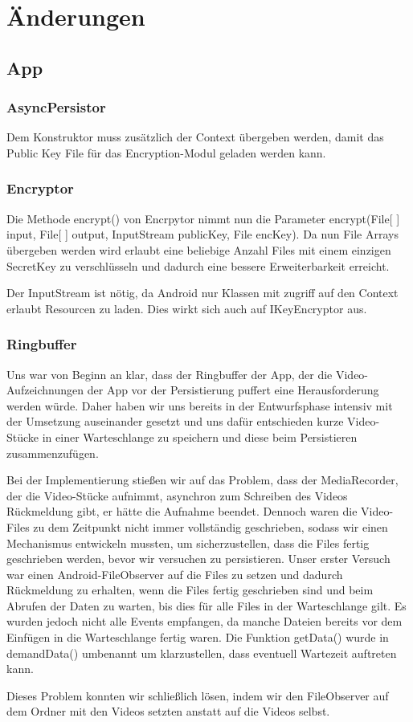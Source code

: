 \chapter{Änderungen} \label{chap:Aenderungen}

\section{App}

\subsection{AsyncPersistor}
Dem Konstruktor muss zusätzlich der Context übergeben werden, damit das Public Key File für das Encryption-Modul geladen werden kann.

\subsection{Encryptor}
Die Methode encrypt() von Encrpytor nimmt nun die Parameter encrypt(File[ ] input, File[ ] output, InputStream publicKey, File encKey). Da nun File Arrays übergeben werden wird erlaubt eine beliebige Anzahl Files mit einem einzigen SecretKey zu verschlüsseln und dadurch eine bessere Erweiterbarkeit erreicht. \par   
Der InputStream ist nötig, da Android nur Klassen mit zugriff auf den Context erlaubt Resourcen zu laden. Dies wirkt sich auch auf IKeyEncryptor aus.

\subsection{Ringbuffer} \label{Ringbuffer}
Uns war von Beginn an klar, dass der Ringbuffer der App, der die Video-Aufzeichnungen der App vor der Persistierung puffert eine Herausforderung werden würde. Daher haben wir uns bereits in der Entwurfsphase intensiv mit der Umsetzung auseinander gesetzt und uns dafür entschieden kurze Video-Stücke in einer Warteschlange zu speichern und diese beim Persistieren zusammenzufügen. \par  
Bei der Implementierung stießen wir auf das Problem, dass der MediaRecorder, der die Video-Stücke aufnimmt, asynchron zum Schreiben des Videos Rückmeldung gibt, er hätte die Aufnahme beendet. Dennoch waren die Video-Files zu dem Zeitpunkt nicht immer vollständig geschrieben, sodass wir einen Mechanismus entwickeln mussten, um sicherzustellen, dass die Files fertig geschrieben werden, bevor wir versuchen zu persistieren. 
Unser erster Versuch war einen Android-FileObserver auf die Files zu setzen und dadurch Rückmeldung zu erhalten, wenn die Files fertig geschrieben sind und beim Abrufen der Daten zu warten, bis dies für alle Files in der Warteschlange gilt. Es wurden jedoch nicht alle Events empfangen, da manche Dateien bereits vor dem Einfügen in die Warteschlange fertig waren. Die Funktion getData() wurde in demandData() umbenannt um klarzustellen, dass eventuell Wartezeit auftreten kann.  \par  
Dieses Problem konnten wir schließlich lösen, indem wir den FileObserver auf dem Ordner mit den Videos setzten anstatt auf die Videos selbst.  \par  

